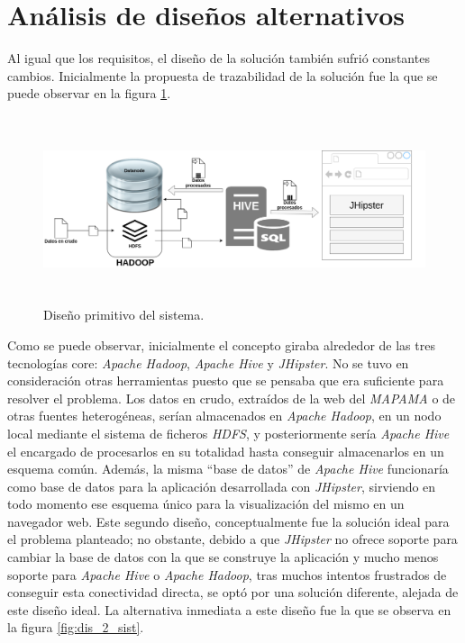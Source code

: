 \section{Análisis de diseños alternativos} \label{c.analisis.disenyos}

Al igual que los requisitos, el diseño de la solución también sufrió constantes cambios. Inicialmente la propuesta de trazabilidad de la solución fue la que se puede observar en la figura \ref{fig:dis_1_sist}. \par

\begin{figure}[H]
    \centering
    \includegraphics[width=1\textwidth,height=5.5cm]{Imagenes/Dis_Fig_1}
    \caption{Diseño primitivo del sistema.}
    \label{fig:dis_1_sist}
\end{figure}
\par


Como se puede observar, inicialmente el concepto giraba alrededor de las tres tecnologías core: \textit{Apache Hadoop}, \textit{Apache Hive} y \textit{JHipster}. No se tuvo en consideración otras herramientas puesto que se pensaba que era suficiente para resolver el problema. Los datos en crudo, extraídos de la web del \textit{MAPAMA} o de otras fuentes heterogéneas, serían almacenados en \textit{Apache Hadoop}, en un nodo local mediante el sistema de ficheros \textit{HDFS}, y posteriormente sería \textit{Apache Hive} el encargado de procesarlos en su totalidad hasta conseguir almacenarlos en un esquema común. Además, la misma “base de datos” de \textit{Apache Hive} funcionaría como base de datos para la aplicación desarrollada con \textit{JHipster}, sirviendo en todo momento ese esquema único para la visualización del mismo en un navegador web. Este segundo diseño, conceptualmente fue la solución ideal para el problema planteado; no obstante, debido a que \textit{JHipster} no ofrece soporte para cambiar la base de datos con la que se construye la aplicación y mucho menos soporte para \textit{Apache Hive} o \textit{Apache Hadoop}, tras muchos intentos frustrados de conseguir esta conectividad directa, se optó por una solución diferente, alejada de este diseño ideal. La alternativa inmediata a este diseño fue la que se observa en la figura \ref{fig:dis_2_sist}. \par


